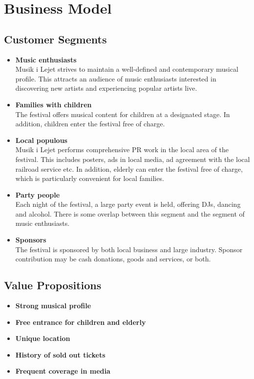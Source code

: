 \section{Business Model} %
\label{sec:business_model}
\subsection{Customer Segments} %
\label{sub:customer_segments}
\begin{itemize}
	\item \textbf{Music enthusiasts}\\
			Musik i Lejet strives to maintain a well-defined and contemporary musical profile. This attracts an audience of music enthusiasts interested in discovering new artists and experiencing popular artists live.
	\item \textbf{Families with children}\\
			The festival offers musical content for children at a designated stage. In addition, children enter the festival free of charge.
	\item \textbf{Local populous}\\
			Musik i Lejet performs comprehensive PR work in the local area of the festival. This includes posters, ads in local media, ad agreement with the local railroad service etc. In addition, elderly can enter the festival free of charge, which is particularly convenient for local families.
	\item \textbf{Party people}\\
			Each night of the festival, a large party event is held, offering DJs, dancing and alcohol. There is some overlap between this segment and the segment of music enthusiasts.
	\item \textbf{Sponsors}\\
			The festival is sponsored by both local business and large industry. Sponsor contribution may be cash donations, goods and services, or both.
\end{itemize}
\subsection{Value Propositions} %
\label{sub:value_propositions}
\begin{itemize}
	\item \textbf{Strong musical profile}
	\item \textbf{Free entrance for children and elderly}
	\item \textbf{Unique location}
	\item \textbf{History of sold out tickets}
	\item \textbf{Frequent coverage in media}
\end{itemize}
